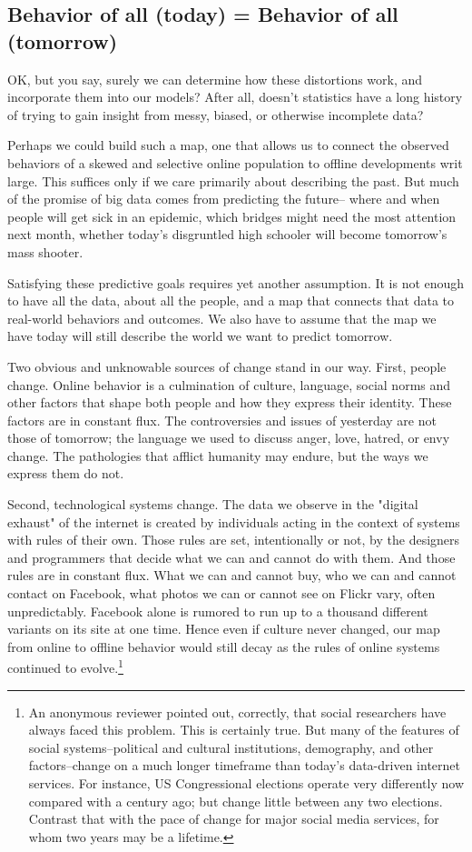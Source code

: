 \documentclass[12pt]{article}
\begin{document}
\subsection{Behavior of all (today) = Behavior of all (tomorrow)}
\label{sec:behave-today-tomorrow}

OK, but you say, surely we can determine how these distortions work,
and incorporate them into our models? After all, doesn't statistics
have a long history of trying to gain insight from messy, biased, or
otherwise incomplete data?

Perhaps we could build such a map, one that allows us to connect the
observed behaviors of a skewed and selective online population to
offline developments writ large. This suffices only if we care
primarily about describing the past. But much of the promise of big
data comes from predicting the future-- where and when people will get
sick in an epidemic, which bridges might need the most attention next
month, whether today's disgruntled high schooler will become
tomorrow's mass shooter.

Satisfying these predictive goals requires yet another assumption. It
is not enough to have all the data, about all the people, and a map
that connects that data to real-world behaviors and outcomes. We also
have to assume that the map we have today will still describe the
world we want to predict tomorrow. 

Two obvious and unknowable sources of change stand in our way. First,
people change. Online behavior is a culmination of culture, language,
social norms and other factors that shape both people and how they
express their identity. These factors are in constant flux. The
controversies and issues of yesterday are not those of tomorrow; the
language we used to discuss anger, love, hatred, or envy change.
The pathologies that afflict humanity may endure, but the ways we
express them do not. 

Second, technological systems change. The data we observe in the
"digital exhaust" of the internet is created by individuals acting in
the context of systems with rules of their own. Those rules are set,
intentionally or not, by the designers and programmers that decide
what we can and cannot do with them. And those rules are in constant
flux. What we can and cannot buy, who we can and cannot contact on
Facebook, what photos we can or cannot see on Flickr vary, often
unpredictably. Facebook alone is rumored to run up to a thousand
different variants on its site at one time. Hence even if culture
never changed, our map from online to offline behavior would still
decay as the rules of online systems continued to evolve.\footnote{An
  anonymous reviewer pointed out, correctly, that social researchers
  have always faced this problem. This is certainly true. But many of
  the features of social systems--political and cultural institutions,
demography, and other factors--change on a much longer timeframe than
today's data-driven internet services. For instance, US Congressional
elections operate very differently now compared with a century ago;
but change little between any two elections. Contrast that with the
pace of change for major social media services, for whom two years
may be a lifetime.}
\end{document}
